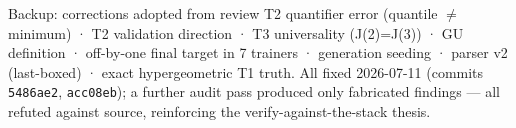 \documentclass[11pt,aspectratio=169]{beamer}
\begin{document}
\begin{frame}{Backup: corrections adopted from review}
T2 quantifier error (quantile $\ne$ minimum) · T2 validation direction ·
T3 universality (J(2)=J(3)) · GU definition · off-by-one final target in 7
trainers · generation seeding · parser v2 (last-boxed) · exact hypergeometric
T1 truth. All fixed 2026-07-11 (commits \texttt{5486ae2}, \texttt{acc08eb});
a further audit pass produced only fabricated findings — all refuted against
source, reinforcing the verify-against-the-stack thesis.
\end{frame}
\end{document}
